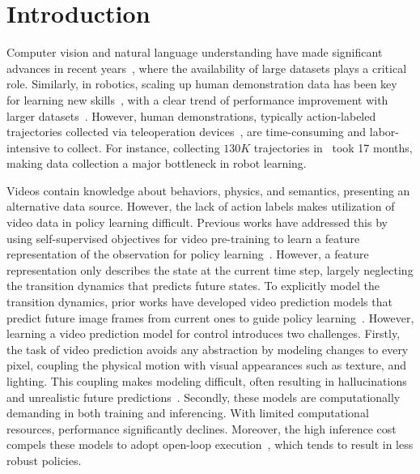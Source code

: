 \section{Introduction} \label{sec:intro}
Computer vision and natural language understanding have made significant advances in recent years~\cite{kirillov2023segment,brown2020language}, where the availability of large datasets plays a critical role. Similarly, in robotics, scaling up human demonstration data has been key for learning new skills~\cite{brohan2022rt,padalkar2023open,fang2023rh20t}, with a clear trend of performance improvement with larger datasets~\cite{mandlekar2021matters,brohan2022rt}. However, human demonstrations, typically action-labeled trajectories collected via teleoperation devices~\cite{zhang2018deep,wu2023gello}, are time-consuming and labor-intensive to collect. For instance, collecting $130K$ trajectories in~\cite{brohan2022rt} took 17 months, making data collection a major bottleneck in robot learning.

Videos contain knowledge about behaviors, physics, and semantics, presenting an alternative data source. However, the lack of action labels makes utilization of video data in policy learning difficult. Previous works have addressed this by using self-supervised objectives for video pre-training to learn a feature representation of the observation for policy learning~\cite{sermanet2018tcn,nair2023r3m,seo2022reinforcement}. However, a feature representation only describes the state at the current time step, largely neglecting the transition dynamics that predicts future states. To explicitly model the transition dynamics, prior works have developed video prediction models that predict future image frames from current ones to guide policy learning~\cite{du2023unipi,yang2023learning, Escontrela23arXiv_VIPER}. However, learning a video prediction model for control introduces two challenges. Firstly, the task of video prediction avoids any abstraction by modeling changes to every pixel, coupling the physical motion with visual appearances such as texture, and lighting. This coupling makes modeling difficult, often resulting in hallucinations and unrealistic future predictions~\cite{du2023unipi}. Secondly, these models are computationally demanding in both training and inferencing. With limited computational resources, performance significantly declines. Moreover, the high inference cost compels these models to adopt open-loop execution~\cite{du2023unipi,black2023zero}, which tends to result in less robust policies.

